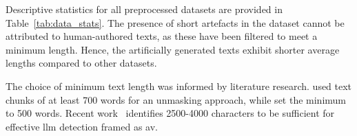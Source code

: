 Descriptive statistics for all preprocessed datasets are provided in Table~\ref{tab:data_stats}.
The presence of short artefacts in the \dataArtificialStudent{} dataset cannot be attributed to human-authored texts, as these have been filtered to meet a minimum length.
Hence, the artificially generated texts exhibit shorter average lengths compared to other datasets.

The choice of minimum text length was informed by literature research.
\citet{bevendorff_generalizing_2019} used text chunks of at least 700 words for an unmasking approach, while \citet{koppel_authorship_2004} set the minimum to 500 words.
Recent work~\citep{llm_detection_av_2025} identifies \num{2500}-\num{4000} characters to be sufficient for effective \ac{llm} detection framed as \ac{av}.

\begin{table}[H]
\centering\small
\caption[Statistics of preprocessed datasets.]{Statistics of preprocessed datasets \dataBlog{}, \dataGutenberg{}, \dataPan{}, \dataStudent{}, and \dataArtificialStudent{}.
$p_s$, $p_{\neg s}$ denote same-author and different-authors pairs, respectively.
$l_w$, $l_c$ denotes text length in words and characters, respectively.
}
\label{tab:data_stats}
\end{table}
